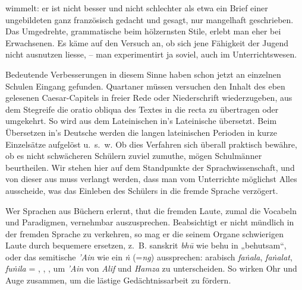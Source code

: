 wimmelt: er ist nicht besser und nicht schlechter als etwa ein Brief einer ungebildeten  ganz französisch gedacht und gesagt, nur mangelhaft geschrieben. Das Umgedrehte, grammatische  beim hölzernsten Stile, erlebt man eher bei Erwachsenen. Es käme auf den Versuch an, ob sich jene Fähigkeit der Jugend nicht ausnutzen liesse, – man experimentirt ja soviel, auch im Unterrichtswesen.

\label{sp.73}

Bedeutende Verbesserungen in diesem Sinne haben schon jetzt an einzelnen Schulen Eingang gefunden. Quartaner müssen versuchen den Inhalt des eben gelesenen Caesar-Capitels in freier Rede oder Niederschrift wiederzugeben, aus dem Stegreife die oratio obliqua des Textes in die recta zu übertragen oder umgekehrt. So wird  aus dem Lateinischen in’s Lateinische übersetzt. Beim Übersetzen in’s Deutsche werden die langen lateinischen Perioden in kurze Einzelsätze aufgelöst u.~s.~w. Ob dies Verfahren sich überall praktisch bewähre, ob es nicht schwächeren Schülern zuviel zumuthe, mögen Schulmänner beurtheilen. Wir stehen hier auf dem Standpunkte der Sprachwissenschaft, und von dieser aus muss verlangt werden, dass man vom Unterrichte möglichst Alles ausscheide, was das Einleben des Schülers in die fremde Sprache verzögert.

\begin{sloppypar}Wer Sprachen aus Büchern erlernt, thut  die fremden Laute, zumal die Vocabeln und Paradigmen, vernehmbar auszusprechen. Beabsichtigt er nicht mündlich in der fremden Sprache zu verkehren, so mag \label{fp.75} er die seinem Organe schwierigen Laute durch bequemere ersetzen, z.~B. sanskrit \textit{bhū} wie behu in „behutsam“, oder das semitische \textit{'Ain} wie ein \textit{ṅ} (=\textit{ng}) aussprechen: arabisch \textit{faṅala}, \textit{faṅalat},  \textit{fuṅila} = , ,  , um \textit{'Ain} von \textit{Alif} und \textit{Hamza} zu unterscheiden. So wirken Ohr und Auge zusammen, um die lästige Gedächtnissarbeit zu fördern.\end{sloppypar}

